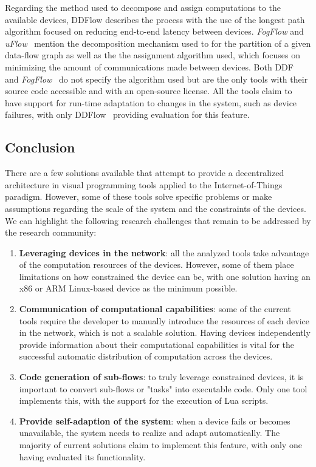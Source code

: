 Regarding the method used to decompose and assign computations to the available devices, DDFlow describes the process with the use of the longest path algorithm focused on reducing end-to-end latency between devices. \textit{FogFlow} and \textit{uFlow}~\cite{fog_flow,flow_based_programming_fog} mention the decomposition mechanism used to for the partition of a given data-flow graph as well as the the assignment algorithm used, which focuses on minimizing the amount of communications made between devices. Both DDF~\cite{ddf} and \textit{FogFlow}~\cite{fog_flow_easy,fog_flow_tool} do not specify the algorithm used but are the only tools with their source code accessible and with an open-source license. All the tools claim to have support for run-time adaptation to changes in the system, such as device failures, with only DDFlow~\cite{ddflow} providing evaluation for this feature.


\subsection{Conclusion}\label{sec:decentralized_sota_conclusion}

There are a few solutions available that attempt to provide a decentralized architecture in visual programming tools applied to the Internet-of-Things paradigm. However, some of these tools solve specific problems or make assumptions regarding the scale of the system and the constraints of the devices. We can highlight the following research challenges that remain to be addressed by the research community:

\begin{enumerate}
    \item \textbf{Leveraging devices in the network}: all the analyzed tools take advantage of the computation resources of the devices. However, some of them place limitations on how constrained the device can be, with one solution having an x86 or ARM Linux-based device as the minimum possible.
    \item \textbf{Communication of computational capabilities}: some of the current tools require the developer to manually introduce the resources of each device in the network, which is not a scalable solution. Having devices independently provide information about their computational capabilities is vital for the successful automatic distribution of computation across the devices.
    \item \textbf{Code generation of sub-flows}: to truly leverage constrained devices, it is important to convert sub-flows or "tasks" into executable code. Only one tool implements this, with the support for the execution of Lua scripts.
    \item \textbf{Provide self-adaption of the system}: when a device fails or becomes unavailable, the system needs to realize and adapt automatically. The majority of current solutions claim to implement this feature, with only one having evaluated its functionality.
\end{enumerate}

